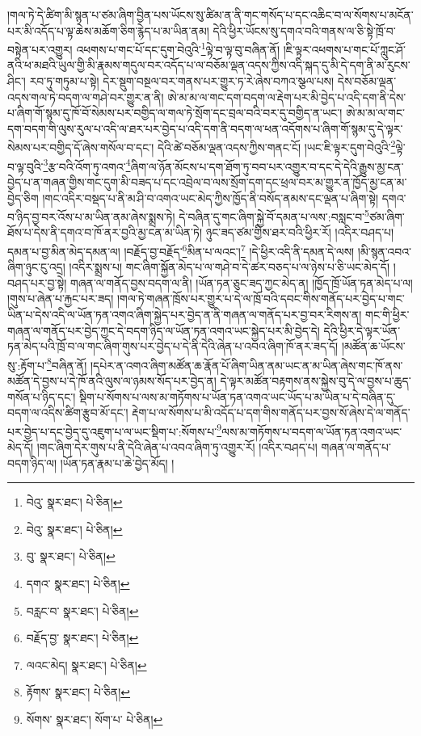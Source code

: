 །གལ་ཏེ་དེ་ཚིག་མི་སྙན་པ་ཙམ་ཞིག་བྱིན་པས་ཡོངས་སུ་ཚིམ་ན་ནི་གང་གསོད་པ་དང་འཆིང་བ་ལ་སོགས་པ་མངོན་པར་མི་འདོད་པ་ལྟ་ཆེས་མཆོག་ཅིག་རྙེད་པ་མ་ཡིན་ནམ། དེའི་ཕྱིར་ཡོངས་སུ་དགའ་བའི་གནས་ལ་ཅི་སྟེ་ཁྲོ་བ་བསྟེན་པར་འགྱུར། འཕགས་པ་གང་པོ་དང་དུག་བེའུའི་\footnote{བེའུ་  སྣར་ཐང་།  པེ་ཅིན། }ལྟེ་བ་ལྟ་བུ་བཞིན་ནོ། །ཇི་ལྟར་འཕགས་པ་གང་པོ་ཀླུང་ཤོ་ནའི་ཕ་མཐའི་ཡུལ་གྱི་མི་རྣམས་གདུལ་བར་འདོད་པ་ལ་བཅོམ་ལྡན་འདས་ཀྱིས་འདི་སྐད་དུ་མི་དེ་དག་ནི་མ་རུངས་ཤིང་། རབ་ཏུ་གཏུམ་པ་སྟེ། དེར་སྡུག་བསྔལ་བར་གནས་པར་གྱུར་ཏ་རེ་ཞེས་བཀའ་སྩལ་པས། དེས་བཅོམ་ལྡན་འདས་གལ་ཏེ་བདག་ལ་གཤེ་བར་གྱུར་ན་ནི། ཨེ་མ་མ་ལ་གང་དག་བདག་ལ་རྡེག་པར་མི་བྱེད་པ་འདི་དག་ནི་དེས་པ་ཞིག་གོ་སྙམ་དུ་ཁོ་བོ་སེམས་པར་བགྱིད་ལ་གལ་ཏེ་སྲོག་དང་བྲལ་བའི་བར་དུ་བགྱིད་ན་ཡང་། ཨེ་མ་མ་ལ་གང་དག་བདག་གི་ལུས་རུལ་པ་འདི་ལ་ཐར་པར་བྱེད་པ་འདི་དག་ནི་བདག་ལ་ཕན་འདོགས་པ་ཞིག་གོ་སྙམ་དུ་དེ་ལྟར་སེམས་པར་བགྱིད་དོ་ཞེས་གསོལ་བ་དང་། དེའི་ཚེ་བཅོམ་ལྡན་འདས་ཀྱིས་གནང་ངོ། །ཡང་ཇི་ལྟར་དུག་བེའུའི་\footnote{བེའུ་  སྣར་ཐང་།  པེ་ཅིན། }ལྟེ་བ་ལྟ་བུའི་\footnote{བུ་  སྣར་ཐང་།  པེ་ཅིན། }རྩ་བའི་འོག་ཏུ་འགའ་\footnote{དགའ་  སྣར་ཐང་།  པེ་ཅིན། }ཞིག་ལ་ཉོན་མོངས་པ་དག་ཐོག་ཏུ་བབ་པར་འགྱུར་བ་དང་དེ་དེའི་རྒྱུས་མྱ་ངན་བྱེད་པ་ན་གཞན་གྱིས་གང་དུག་མི་བཟད་པ་དང་འབྲེལ་བ་ལས་སྲོག་དག་དང་ཕྲལ་བར་མ་གྱུར་ན་ཁྱོད་མྱ་ངན་མ་བྱེད་ཅིག །གང་འདིར་བསྡད་པ་ནི་མ་ཤི་བ་འགའ་ཡང་མེད་ཀྱིས་ཁྱོད་ནི་བསོད་ནམས་དང་ལྡན་པ་ཞིག་སྟེ། དགའ་བ་ཉིད་བྱ་བར་འོས་པ་མ་ཡིན་ནམ་ཞེས་སྨྲས་ཏེ། དེ་བཞིན་དུ་གང་ཞིག་སྐྱེ་བོ་དམན་པ་ལས་:བསླང་བ་\footnote{བརླང་བ་  སྣར་ཐང་།  པེ་ཅིན། }ཙམ་ཞིག་ཐོས་པ་དེས་ནི་དགའ་བ་ཁོ་ནར་བྱའི་མྱ་ངན་མ་ཡིན་ཏེ། ཉུང་ཟད་ཙམ་གྱིས་ཐར་བའི་ཕྱིར་རོ། །འདིར་བཤད་པ། དམན་པ་བྱ་མིན་མེད་དམན་ལ། །བརྗོད་བྱ་བརྗོད་\footnote{བརྗོད་བྱ་  སྣར་ཐང་།  པེ་ཅིན། }མིན་པ་ལའང་།\footnote{ལའང་མེད།  སྣར་ཐང་།  པེ་ཅིན། } །དེ་ཕྱིར་འདི་ནི་དམན་དེ་ལས། །མི་སྙན་འབའ་ཞིག་ཉུང་ངུ་འདྲ། །འདིར་སྨྲས་པ། གང་ཞིག་སྐྱོན་མེད་པ་ལ་གཤེ་བ་དེ་ཚར་བཅད་པ་ལ་ཉེས་པ་ཅི་ཡང་མེད་དོ། །བཤད་པར་བྱ་སྟེ། གཞན་ལ་གནོད་བྱས་བདག་ལ་ནི། །ཡོན་ཏན་ཅུང་ཟད་ཀྱང་མེད་ན། །ཁྱོད་ཁྲོ་ཡོན་ཏན་མེད་པ་ལ། །གུས་པ་ཞེན་པ་རྐྱང་པར་ཟད། །གལ་ཏེ་གཞན་ཁྲོས་པར་གྱུར་པ་དེ་ལ་ཁྲོ་བའི་དབང་གིས་གནོད་པར་བྱེད་པ་གང་ཡིན་པ་དེས་འདི་ལ་ཡོན་ཏན་འགའ་ཞིག་སྐྱེད་པར་བྱེད་ན་ནི་གཞན་ལ་གནོད་པར་བྱ་བར་རིགས་ན། གང་གི་ཕྱིར་གཞན་ལ་གནོད་པར་བྱེད་ཀྱང་དེ་བདག་ཉིད་ལ་ཡོན་ཏན་འགའ་ཡང་སྐྱེད་པར་མི་བྱེད་དེ། དེའི་ཕྱིར་དེ་ལྟར་ཡོན་ཏན་མེད་པའི་ཁྲོ་བ་ལ་གང་ཞིག་གུས་པར་བྱེད་པ་དེ་ནི་དེའི་ཞེན་པ་འབའ་ཞིག་ཁོ་ནར་ཟད་དོ། །མཚོན་ཆ་ཡོངས་སུ་:རྟོག་པ་\footnote{རྟོགས་  སྣར་ཐང་།  པེ་ཅིན། }བཞིན་ནོ། །དཔེར་ན་འགའ་ཞིག་མཚོན་ཆ་རྣོན་པོ་ཞིག་ཡིན་ནམ་ཡང་ན་མ་ཡིན་ཞེས་གང་ཁོ་ནས་མཚོན་དེ་བྱས་པ་དེ་ཁོ་ནའི་ལུས་ལ་ཉམས་སོད་པར་བྱེད་ན། དེ་ལྟར་མཚོན་བརྟགས་ནས་སྐྱེས་བུ་དེ་ལ་བྱས་པ་ཆུད་གསོན་པ་ཉིད་དང་། སྡིག་པ་སོགས་པ་ལས་མ་གཏོགས་པ་ཡོན་ཏན་འགའ་ཡང་ཡོད་པ་མ་ཡིན་པ་དེ་བཞིན་དུ་བདག་ལ་འདིས་ཚིག་རྩུབ་མོ་དང་། རྡེག་པ་ལ་སོགས་པ་མི་འདོད་པ་དག་གིས་གནོད་པར་བྱས་སོ་ཞེས་དེ་ལ་གནོད་པར་བྱེད་པ་དང་བྱེད་དུ་འཇུག་པ་ལ་ཡང་སྡིག་པ་:སོགས་པ་\footnote{སོགས་  སྣར་ཐང་། སོག་པ་  པེ་ཅིན། }ལས་མ་གཏོགས་པ་བདག་ལ་ཡོན་ཏན་འགའ་ཡང་མེད་དོ། །གང་ཞིག་དེར་གུས་པ་ནི་དེའི་ཞེན་པ་འབའ་ཞིག་ཏུ་འགྱུར་རོ། །འདིར་བཤད་པ། གཞན་ལ་གནོད་པ་བདག་ཉིད་ལ། །ཡོན་ཏན་རྣམ་པ་ཆེ་བྱེད་མོད། །
